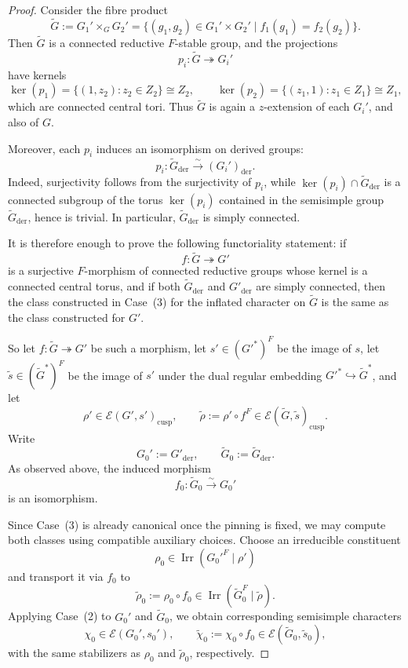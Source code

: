 \documentclass{amsart}
\theoremstyle{plain}
\numberwithin{equation}{section}
\theoremstyle{definition}
\newcommand{\cE}{\mathcal{E}}
\newcommand{\Irr}{\operatorname{Irr}}
\newcommand{\der}{\operatorname{der}}
\newcommand{\cusp}{\operatorname{cusp}}
\begin{document}
\begin{proof}
Consider the fibre product
\[
\widetilde G:= G_1' \times_G G_2'
=
\{(g_1,g_2)\in G_1'\times G_2' \mid f_1(g_1)=f_2(g_2)\}.
\]
Then \(\widetilde G\) is a connected reductive \(F\)-stable group, and the projections
\[
p_i:\widetilde G \twoheadrightarrow G_i'
\]
have kernels
\[
\ker(p_1)=\{(1,z_2):z_2\in Z_2\}\cong Z_2,
\qquad
\ker(p_2)=\{(z_1,1):z_1\in Z_1\}\cong Z_1,
\]
which are connected central tori. Thus \(\widetilde G\) is again a \(z\)-extension of each
\(G_i'\), and also of \(G\).

Moreover, each \(p_i\) induces an isomorphism on derived groups:
\[
p_i:\widetilde G_{\der}\xrightarrow{\sim} (G_i')_{\der}.
\]
Indeed, surjectivity follows from the surjectivity of \(p_i\), while
\(\ker(p_i)\cap \widetilde G_{\der}\) is a connected subgroup of the torus \(\ker(p_i)\) contained
in the semisimple group \(\widetilde G_{\der}\), hence is trivial. In particular,
\(\widetilde G_{\der}\) is simply connected.

It is therefore enough to prove the following functoriality statement: if
\[
f:\widetilde G \twoheadrightarrow G'
\]
is a surjective \(F\)-morphism of connected reductive groups whose kernel is a connected central
torus, and if both \(\widetilde G_{\der}\) and \(G'_{\der}\) are simply connected, then the class
constructed in Case~\textup{(3)} for the inflated character on \(\widetilde G\) is the same as the
class constructed for \(G'\).

So let \(f:\widetilde G\twoheadrightarrow G'\) be such a morphism, let \(s'\in (G'^*)^F\) be the
image of \(s\), let \(\widetilde s\in (\widetilde G^*)^F\) be the image of \(s'\) under the dual
regular embedding \(G'^*\hookrightarrow \widetilde G^*\), and let
\[
\rho'\in \cE(G',s')_{\cusp},
\qquad
\widetilde\rho:=\rho'\circ f^F\in \cE(\widetilde G,\widetilde s)_{\cusp}.
\]
Write
\[
G_0':=G'_{\der},\qquad \widetilde G_0:=\widetilde G_{\der}.
\]
As observed above, the induced morphism
\[
f_0:\widetilde G_0\xrightarrow{\sim} G_0'
\]
is an isomorphism.

Since Case~\textup{(3)} is already canonical once the pinning is fixed, we may compute both
classes using compatible auxiliary choices. Choose an irreducible constituent
\[
\rho_0\in \Irr(G_0'^F\mid \rho')
\]
and transport it via \(f_0\) to
\[
\widetilde\rho_0:=\rho_0\circ f_0 \in \Irr(\widetilde G_0^F\mid \widetilde\rho).
\]
Applying Case~\textup{(2)} to \(G_0'\) and \(\widetilde G_0\), we obtain corresponding semisimple
characters
\[
\chi_0\in \cE(G_0',s_0') ,\qquad
\widetilde\chi_0:=\chi_0\circ f_0 \in \cE(\widetilde G_0,\widetilde s_0),
\]
with the same stabilizers as \(\rho_0\) and \(\widetilde\rho_0\), respectively.


\end{proof}
\end{document}
